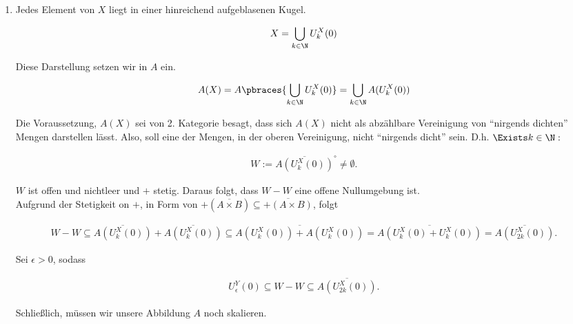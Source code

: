 \begin{solution}

\phantom{}

\begin{enumerate}[label = (\roman*)]

  \item
  Jedes Element von $X$ liegt in einer hinreichend aufgeblasenen Kugel.

  \begin{align*}
    X = \bigcup_{k \in \N} U_k^X(0)
  \end{align*}

  Diese Darstellung setzen wir in $A$ ein.

  \begin{align*}
    A(X)
    =
    A \pbraces
    {
      \bigcup_{k \in \N}
      U_k^X(0)
    }
    =
    \bigcup_{k \in \N}
    A(U_k^X(0))
  \end{align*}

  Die Voraussetzung, $A(X)$ sei von 2. Kategorie besagt, dass sich $A(X)$ nicht als abzählbare Vereinigung von \enquote{nirgends dichten} Mengen darstellen lässt.
  Also, soll eine der Mengen, in der oberen Vereinigung, nicht \enquote{nirgends dicht} sein.
  D.h. $\Exists k \in \N:$

  \begin{align*}
    W := \overline{A(U_k^X(0))}^\circ \neq \emptyset.
  \end{align*}

  $W$ ist offen und nichtleer und $+$ stetig.
  Daraus folgt, dass $W - W$ eine offene Nullumgebung ist. \\

  Aufgrund der Stetigkeit on $+$, in Form von $+(\overline{A \times B}) \subseteq \overline{+(A \times B)}$, folgt

  \begin{align*}
    W - W
    \subseteq
    \overline{A(U_k^X(0))} + \overline{A(U_k^X(0))}
    \subseteq
    \overline{A(U_k^X(0)) + A(U_k^X(0))}
    =
    \overline{A(U_k^X(0) + U_k^X(0))}
    =
    \overline{A(U_{2k}^X(0))}.
  \end{align*}

  Sei $\epsilon > 0$, sodass

  \begin{align*}
    U_{\epsilon}^Y(0)
    \subseteq
    W - W
    \subseteq
    \overline{A(U_{2k}^X(0))}.
  \end{align*}

  Schließlich, müssen wir unsere Abbildung $A$ noch skalieren.


\end{enumerate}
\end{solution}
